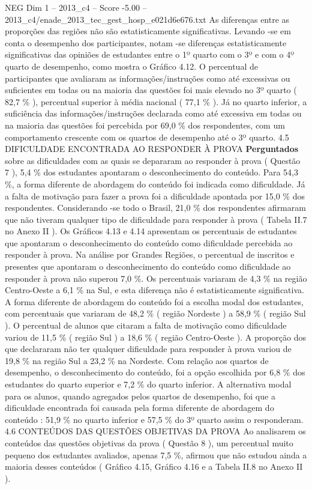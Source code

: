 \begin{textsample}{NEG Dim 1 – 2013\_c4 – Score -5.00 – 2013\_c4/enade\_2013\_tec\_gest\_hosp\_e021d6e676.txt}
As diferenças entre as proporções das regiões não são estatisticamente significativas.
Levando -se em conta o desempenho dos participantes, notam -se diferenças estatisticamente significativas das opiniões de estudantes entre o 1º quarto com o 3º e com o 4º quarto de desempenho, como mostra o Gráfico 4.12.
O percentual de participantes que avaliaram as informações/instruções como até excessivas ou suficientes em todas ou na maioria das questões foi mais elevado no 3º quarto ( 82,7 \% ), percentual superior à média nacional ( 77,1 \% ).
Já no quarto inferior, a suficiência das informações/instruções declarada como até excessiva em todas ou na maioria das questões foi percebida por 69,0 \% dos respondentes, com um comportamento crescente com os quartos de desempenho até o 3º quarto. 4.5 DIFICULDADE ENCONTRADA AO RESPONDER À PROVA \textbf{Perguntados} sobre as dificuldades com as quais se depararam ao responder à prova ( Questão 7 ), 5,4 \% dos estudantes apontaram o desconhecimento do conteúdo.
Para 54,3 \%, a forma diferente de abordagem do conteúdo foi indicada como dificuldade.
Já a falta de motivação para fazer a prova foi a dificuldade apontada por 15,0 \% dos respondentes.
Considerando -se todo o Brasil, 21,0 \% dos respondentes afirmaram que não tiveram qualquer tipo de dificuldade para responder à prova ( Tabela II.7 no Anexo II ).
Os Gráficos 4.13 e 4.14 apresentam os percentuais de estudantes que apontaram o desconhecimento do conteúdo como dificuldade percebida ao responder à prova.
Na análise por Grandes Regiões, o percentual de inscritos e presentes que apontaram o desconhecimento do conteúdo como dificuldade ao responder à prova não superou 7,0 \%.
Os percentuais variaram de 4,3 \% na região Centro-Oeste a 6,1 \% na Sul, e esta diferença não é estatisticamente significativa.
A forma diferente de abordagem do conteúdo foi a escolha modal dos estudantes, com percentuais que variaram de 48,2 \% ( região Nordeste ) a 58,9 \% ( região Sul ).
O percentual de alunos que citaram a falta de motivação como dificuldade variou de 11,5 \% ( região Sul ) a 18,6 \% ( região Centro-Oeste ).
A proporção dos que declararam não ter qualquer dificuldade para responder à prova variou de 19,8 \% na região Sul a 23,2 \% na Nordeste.
Com relação aos quartos de desempenho, o desconhecimento do conteúdo, foi a opção escolhida por 6,8 \% dos estudantes do quarto superior e 7,2 \% do quarto inferior.
A alternativa modal para os alunos, quando agregados pelos quartos de desempenho, foi que a dificuldade encontrada foi causada pela forma diferente de abordagem do conteúdo : 51,9 \% no quarto inferior e 57,5 \% do 3º quarto assim o responderam. 4.6 CONTEÚDOS DAS QUESTÕES OBJETIVAS DA PROVA Ao analisarem os conteúdos das questões objetivas da prova ( Questão 8 ), um percentual muito pequeno dos estudantes avaliados, apenas 7,5 \%, afirmou que não estudou ainda a maioria desses conteúdos ( Gráfico 4.15, Gráfico 4.16 e a Tabela II.8 no Anexo II ).

\end{textsample}
